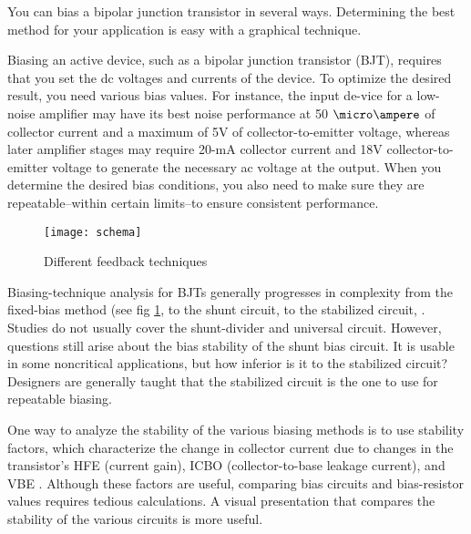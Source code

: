 %
%
%
%

You can bias a bipolar junction transistor in several ways. Determining the best method for your application is easy with a graphical technique.

Biasing an active device, such as a bipolar junction transistor (BJT), requires that you set the dc voltages and currents of the device. To optimize the desired result, you need various bias values. For instance, the input de-vice for a low-noise amplifier may have its best noise performance at 50 $\micro\ampere$ of collector current and a maximum of 5V of collector-to-emitter voltage, whereas later amplifier stages may require 20-mA collector current and 18V collector-to-emitter voltage to generate the necessary ac voltage at the output. When you determine the desired bias conditions, you also need to make sure they are repeatable--within certain limits--to ensure consistent performance.

\begin{figure}[htbp]
\begin{center}
	\texttt{[image: schema]}
	\caption{Different feedback techniques}
	\label{design:bjt:bias:schemas}
\end{center}
\end{figure}

Biasing-technique analysis for BJTs generally progresses in complexity from the fixed-bias method (see fig \ref{design:bjt:bias:schemas}, to the shunt circuit, to the stabilized circuit, . Studies do not usually cover the shunt-divider  and universal  circuit. However, questions still arise about the bias stability of the shunt bias circuit. It is usable in some noncritical applications, but how inferior is it to the stabilized circuit? Designers are generally taught that the stabilized circuit is the one to use for repeatable biasing.

\bigskip

One way to analyze the stability of the various biasing methods is to use stability factors, which characterize the change in collector current due to changes in the transistor's HFE (current gain), ICBO (collector-to-base leakage current), and VBE . Although these factors are useful, comparing bias circuits and bias-resistor values requires tedious calculations. A visual presentation that compares the stability of the various circuits is more useful.

